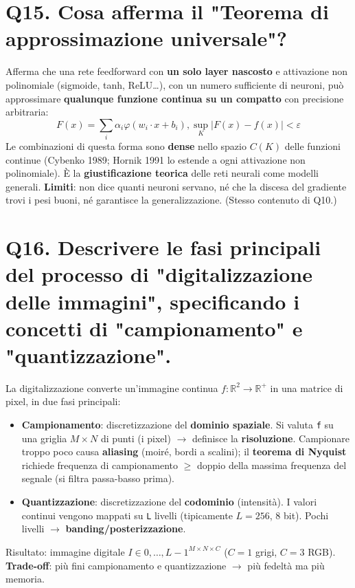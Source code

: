 \documentclass[11pt,a4paper]{article}
\begin{document}
\section*{Q15. Cosa afferma il "Teorema di approssimazione universale"?}
Afferma che una rete feedforward con \textbf{un solo layer nascosto} e attivazione non polinomiale (sigmoide, tanh, ReLU…), con un numero sufficiente di neuroni, può approssimare \textbf{qualunque funzione continua su un compatto} con precisione arbitraria:
\[ F(x) = \sum _{i} \alpha _{i} \varphi (w_{i}\cdot x + b_{i}),   \operatorname{sup}_K |F(x) - f(x)| < \varepsilon  \]
Le combinazioni di questa forma sono \textbf{dense} nello spazio $C(K)$ delle funzioni continue (Cybenko 1989; Hornik 1991 lo estende a ogni attivazione non polinomiale).
È la \textbf{giustificazione teorica} delle reti neurali come modelli generali. \textbf{Limiti}: non dice quanti neuroni servano, né che la discesa del gradiente trovi i pesi buoni, né garantisce la generalizzazione. (Stesso contenuto di Q10.)
\newpage
\section*{Q16. Descrivere le fasi principali del processo di "digitalizzazione delle immagini", specificando i concetti di "campionamento" e "quantizzazione".}
La digitalizzazione converte un'immagine continua $f: \mathbb{R}^{2} \to  \mathbb{R}^{+}$ in una matrice di pixel, in due fasi principali:
\begin{itemize}
\item \textbf{Campionamento}: discretizzazione del \textbf{dominio spaziale}. Si valuta \texttt{f} su una griglia $M\times N$ di punti (i pixel) $\to $ definisce la \textbf{risoluzione}. Campionare troppo poco causa \textbf{aliasing} (moiré, bordi a scalini); il \textbf{teorema di Nyquist} richiede frequenza di campionamento $\ge $ doppio della massima frequenza del segnale (si filtra passa-basso prima).
\item \textbf{Quantizzazione}: discretizzazione del \textbf{codominio} (intensità). I valori continui vengono mappati su \texttt{L} livelli (tipicamente $L=256$, 8 bit). Pochi livelli $\to $ \textbf{banding/posterizzazione}.
\end{itemize}
Risultato: immagine digitale $I \in  {0,\dots ,L-1}^{M\times N\times C}$ ($C=1$ grigi, $C=3$ RGB). \textbf{Trade-off}: più fini campionamento e quantizzazione $\to $ più fedeltà ma più memoria.
\newpage
\end{document}
